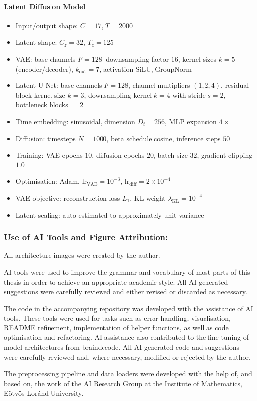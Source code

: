 \paragraph{Latent Diffusion Model}
\begin{itemize}
    \item Input/output shape: $C=17$, $T=2000$
    \item Latent shape: $C_z=32$, $T_z=125$
    \item VAE: base channels $F=128$, downsampling factor $16$, kernel sizes $k=5$ (encoder/decoder), $k_{\mathrm{out}}=7$, activation SiLU, GroupNorm
    \item Latent U-Net: base channels $F=128$, channel multipliers $(1,2,4)$, residual block kernel size $k=3$, downsampling kernel $k=4$ with stride $s=2$, bottleneck blocks $=2$
    \item Time embedding: sinusoidal, dimension $D_t=256$, MLP expansion $4\times$
    \item Diffusion: timesteps $N=1000$, beta schedule cosine, inference steps $50$
    \item Training: VAE epochs $10$, diffusion epochs $20$, batch size $32$, gradient clipping $1.0$
    \item Optimisation: Adam, $\mathrm{lr}_{\mathrm{VAE}}=10^{-3}$, $\mathrm{lr}_{\mathrm{diff}}=2 \times 10^{-4}$
    \item VAE objective: reconstruction loss $L_1$, KL weight $\lambda_{\mathrm{KL}}=10^{-4}$
    \item Latent scaling: auto-estimated to approximately unit variance
\end{itemize}

\newpage

\subsubsection{Use of AI Tools and Figure Attribution:}

All architecture images were created by the author.

AI tools were used to improve the grammar and vocabulary of most parts of this thesis in order to achieve an appropriate academic style. All AI-generated suggestions were carefully reviewed and either revised or discarded as necessary.

The code in the accompanying repository was developed with the assistance of AI tools. These tools were used for tasks such as error handling, visualisation, README refinement, implementation of helper functions, as well as code optimisation and refactoring. AI assistance also contributed to the fine-tuning of model architectures from braindecode. All AI-generated code and suggestions were carefully reviewed and, where necessary, modified or rejected by the author.

The preprocessing pipeline and data loaders were developed with the help of, and based on, the work of the AI Research Group at the Institute of Mathematics, Eötvös Loránd University.
